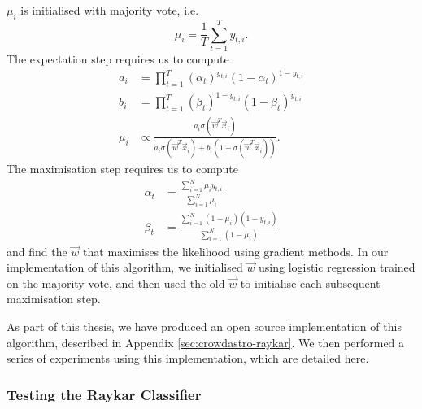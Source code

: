         $\mu_i$ is initialised with majority vote, i.e.
        \begin{equation*}
            \mu_i = \frac{1}{T} \sum_{t = 1}^T y_{t, i}.
        \end{equation*}
        The expectation step requires us to compute
        \begin{align*}
            a_i &= \prod_{t = 1}^T
                (\alpha_t)^{y_{t, i}} (1 - \alpha_t)^{1 - y_{t, i}}\\
            b_i &= \prod_{t = 1}^T
                (\beta_t)^{1 - y_{t, i}} (1 - \beta_t)^{y_{t, i}}\\
            \mu_i &\propto
                \frac{a_i \sigma(\vec w^T \vec x_i)}
                     {a_i \sigma(\vec w^T \vec x_i) +
                      b_i (1 - \sigma(\vec w^T \vec x_i))}.
        \end{align*}
        The maximisation step requires us to compute
        \begin{align}
            \label{eq:raykar-alpha}
            \alpha_t &= \frac{\sum_{i = 1}^N \mu_i y_{t, i}}
                             {\sum_{i = 1}^N \mu_i}\\
            \label{eq:raykar-beta}
            \beta_t &= \frac{\sum_{i = 1}^N (1 - \mu_i) (1 - y_{t, i})}
                            {\sum_{i = 1}^N (1 - \mu_i)}
        \end{align}
        and find the $\vec w$ that maximises the likelihood using gradient
        methods. In our implementation of this algorithm, we initialised $\vec
        w$ using logistic regression trained on the majority vote, and then used
        the old $\vec w$ to initialise each subsequent maximisation step.

        As part of this thesis, we have produced an open source implementation
        of this algorithm, described in Appendix \ref{sec:crowdastro-raykar}. We
        then performed a series of experiments using this implementation, which
        are detailed here.

        \subsubsection{Testing the Raykar Classifier}

